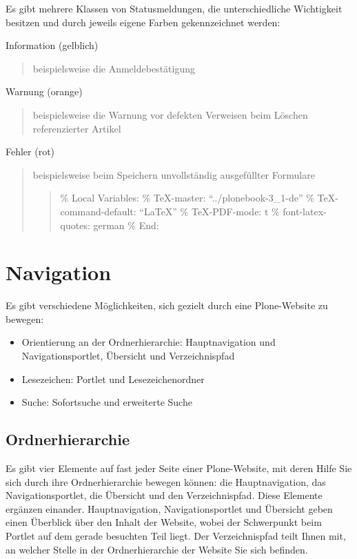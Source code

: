 \documentclass[a4paper,12pt,ngerman]{manual}
\begin{document}
Es gibt mehrere Klassen von Statusmeldungen, die unterschiedliche Wichtigkeit
besitzen und durch jeweils eigene Farben gekennzeichnet werden:

Information (gelblich)
\begin{quote}

beispielsweise die Anmeldebestätigung
\end{quote}

Warnung (orange)
\begin{quote}

beispielsweise die Warnung vor defekten Verweisen beim Löschen
referenzierter Artikel
\end{quote}

Fehler (rot)
\begin{quote}

beispielsweise beim Speichern unvollständig ausgefüllter Formulare
\begin{quote}

\% Local Variables:
\% TeX-master: ``../plonebook-3\_1-de''
\% TeX-command-default: ``LaTeX''
\% TeX-PDF-mode: t
\% font-latex-quotes: german
\% End:
\end{quote}
\end{quote}

\resetcurrentobjects
\hypertarget{--doc-oberflaeche/navigation}{}

\hypertarget{sec-navigation}{}\section{Navigation}

Es gibt verschiedene Möglichkeiten, sich gezielt durch eine Plone-Website zu
bewegen:
\begin{itemize}
\item {} 
Orientierung an der Ordnerhierarchie: Hauptnavigation und
Navigationsportlet, Übersicht und Verzeichnispfad

\item {} 
Lesezeichen: Portlet und Lesezeichenordner

\item {} 
Suche: Sofortsuche und erweiterte Suche

\end{itemize}


\subsection{Ordnerhierarchie}

Es gibt vier Elemente auf fast jeder Seite einer Plone-Website, mit deren
Hilfe Sie sich durch ihre Ordnerhierarchie bewegen können: die
Hauptnavigation, das Navigationsportlet, die Übersicht und den
Verzeichnispfad. Diese Elemente ergänzen einander. Hauptnavigation,
Navigationsportlet und Übersicht geben einen Überblick über den
Inhalt der Website, wobei der Schwerpunkt beim Portlet auf dem gerade
besuchten Teil liegt. Der Verzeichnispfad teilt Ihnen mit, an welcher Stelle
in der Ordnerhierarchie der Website Sie sich befinden.
\end{document}

